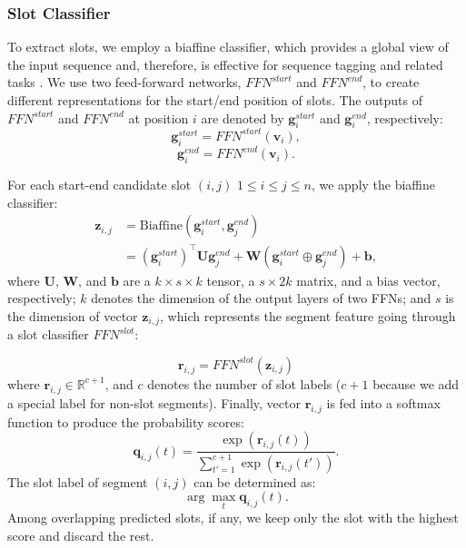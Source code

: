 \documentclass{ecai}
\begin{document}
\subsubsection{Slot Classifier}
To extract slots, we employ a biaffine classifier, which provides a global view of the input sequence and, therefore, is effective for sequence tagging and related tasks \cite{Li:2019}. We use two feed-forward networks, $FFN^{start}$ and $FFN^{end}$, to create different representations for the start/end position of slots. The outputs of $FFN^{start}$ and $FFN^{end}$ at position $i$ are denoted by $\textbf{g}_i^{start}$  and $\textbf{g}_i^{end}$, respectively:
$$\textbf{g}_i^{start} =FFN^{start}(\textbf{v}_i),$$
$$\textbf{g}_i^{end} =FFN^{end}(\textbf{v}_i).$$

For each start-end candidate slot $(i,j)$ $1 \leq i \leq j \leq n$, we apply the biaffine classifier:
\begin{equation}
\begin{aligned}
\textbf{z}_{i,j} & = \text{Biaffine}(\textbf{g}_i^{start},\textbf{g}_j^{end}) \\
                 & = (\textbf{g}_i^{start})^{\top}  \textbf{U} \textbf{g}_j^{end} + \textbf{W}(\textbf{g}_i^{start}\oplus \textbf{g}_j^{end})+\textbf{b}, \nonumber
\end{aligned}
\end{equation}
where $\textbf{U}$, $\textbf{W}$, and $\textbf{b}$ are a $k \times s \times k$ tensor, a $s \times 2k$ matrix, and a bias vector, respectively; $k$ denotes the dimension of the output layers of two FFNs; and $s$ is the dimension of vector $\textbf{z}_{i,j}$, which represents the segment feature going through a slot classifier $FFN^{slot}$:

\begin{equation}
\nonumber
    \textbf{r}_{i,j} = FFN^{slot}(\textbf{z}_{i,j})
\end{equation}
where $\textbf{r}_{i,j} \in \mathbb{R}^{c+1}$, and $c$ denotes the number of slot labels ($c + 1$ because we add a special label for non-slot
segments). Finally, vector $\textbf{r}_{i,j}$ is fed into a softmax function to produce the probability scores:
$$\textbf{q}_{i,j}(t)= \frac{\exp(\textbf{r}_{i,j}(t))}{\sum_{t'=1}^{c+1}{\exp(\textbf{r}_{i,j}(t'))}}.$$
The slot label of segment $(i,j)$ can be determined as:
$$\arg \max_t \textbf{q}_{i,j}(t).$$
Among overlapping predicted slots, if any, we keep only the slot with the highest score and discard the rest.
\end{document}
